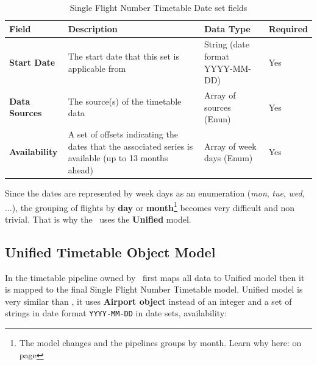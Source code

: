 \begin{table}[H]
\centering
\begin{tabular}{|>{\raggedright\arraybackslash}p{2.5cm}|>{\raggedright\arraybackslash}p{4.7cm}|>{\raggedright\arraybackslash}p{3cm}|>{\raggedright\arraybackslash}p{2cm}|}
\hline
\textbf{Field}        & \textbf{Description}                                                                                  & \textbf{Data Type}              & \textbf{Required} \\ \hline
\textbf{Start Date}   & The start date that this set is applicable from                                                       & String (date format YYYY-MM-DD) & Yes               \\ \hline
\textbf{Data Sources} & The source(s) of the timetable data                                                                   & Array of sources (Enun)         & Yes               \\ \hline
\textbf{Availability} & A set of offsets indicating the dates that the associated series is available (up to 13 months ahead) & Array of week days (Enum)       & Yes               \\ \hline
\end{tabular}
\caption{Single Flight Number Timetable Date set fields}
\label{sfn-date-set}
\end{table}

Since the dates are represented by week days as an enumeration (\textit{mon}, \textit{tue}, \textit{wed}, ...), the grouping of flights by \textbf{day} or \textbf{month}\footnote{The model changes and the pipelines groups by month. Learn why here:  on page \pageref{month_version}} becomes very difficult and non trivial. That is why the \thesis\ uses the \textbf{Unified} model.

\subsection{Unified Timetable Object Model} \label{unified-model}

In the timetable pipeline owned by \squad\ first maps all data to Unified model then it is mapped to the final Single Flight Number Timetable model. Unified model is very similar than , it uses \textbf{Airport object} instead of an integer and a set of strings in date format \texttt{YYYY-MM-DD} in date sets, availability:

